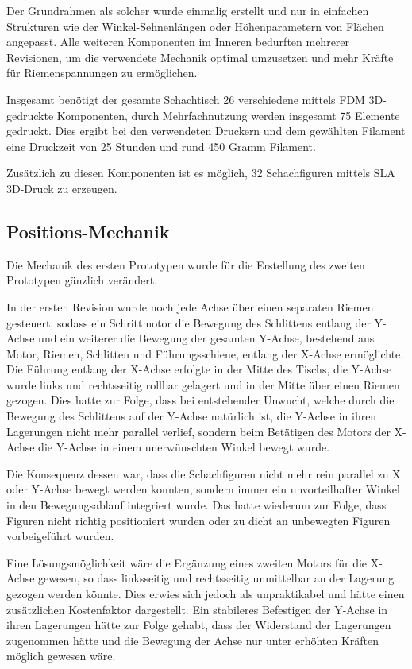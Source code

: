 Der Grundrahmen als solcher wurde einmalig erstellt und nur in einfachen
Strukturen wie der Winkel-Sehnenlängen oder Höhenparametern von Flächen
angepasst. Alle weiteren Komponenten im Inneren bedurften mehrerer
Revisionen, um die verwendete Mechanik optimal umzusetzen und mehr
Kräfte für Riemenspannungen zu ermöglichen.

Insgesamt benötigt der gesamte Schachtisch 26 verschiedene mittels FDM
3D-gedruckte Komponenten, durch Mehrfachnutzung werden insgesamt 75
Elemente gedruckt. Dies ergibt bei den verwendeten Druckern und dem
gewählten Filament eine Druckzeit von 25 Stunden und rund 450 Gramm
Filament.

Zusätzlich zu diesen Komponenten ist es möglich, 32 Schachfiguren
mittels SLA 3D-Druck zu erzeugen.

\hypertarget{positions-mechanik}{%
\subsection{Positions-Mechanik}\label{positions-mechanik}}

Die Mechanik des ersten Prototypen wurde für die Erstellung des zweiten
Prototypen gänzlich verändert.

In der ersten Revision wurde noch jede Achse über einen separaten Riemen
gesteuert, sodass ein Schrittmotor die Bewegung des Schlittens entlang
der Y-Achse und ein weiterer die Bewegung der gesamten Y-Achse,
bestehend aus Motor, Riemen, Schlitten und Führungsschiene, entlang der
X-Achse ermöglichte. Die Führung entlang der X-Achse erfolgte in der
Mitte des Tischs, die Y-Achse wurde links und rechtsseitig rollbar
gelagert und in der Mitte über einen Riemen gezogen. Dies hatte zur
Folge, dass bei entstehender Unwucht, welche durch die Bewegung des
Schlittens auf der Y-Achse natürlich ist, die Y-Achse in ihren
Lagerungen nicht mehr parallel verlief, sondern beim Betätigen des
Motors der X-Achse die Y-Achse in einem unerwünschten Winkel bewegt
wurde.

Die Konsequenz dessen war, dass die Schachfiguren nicht mehr rein
parallel zu X oder Y-Achse bewegt werden konnten, sondern immer ein
unvorteilhafter Winkel in den Bewegungsablauf integriert wurde. Das
hatte wiederum zur Folge, dass Figuren nicht richtig positioniert wurden
oder zu dicht an unbewegten Figuren vorbeigeführt wurden.

Eine Lösungsmöglichkeit wäre die Ergänzung eines zweiten Motors für die
X-Achse gewesen, so dass linksseitig und rechtsseitig unmittelbar an der
Lagerung gezogen werden könnte. Dies erwies sich jedoch als
unpraktikabel und hätte einen zusätzlichen Kostenfaktor dargestellt. Ein
stabileres Befestigen der Y-Achse in ihren Lagerungen hätte zur Folge
gehabt, dass der Widerstand der Lagerungen zugenommen hätte und die
Bewegung der Achse nur unter erhöhten Kräften möglich gewesen wäre.

